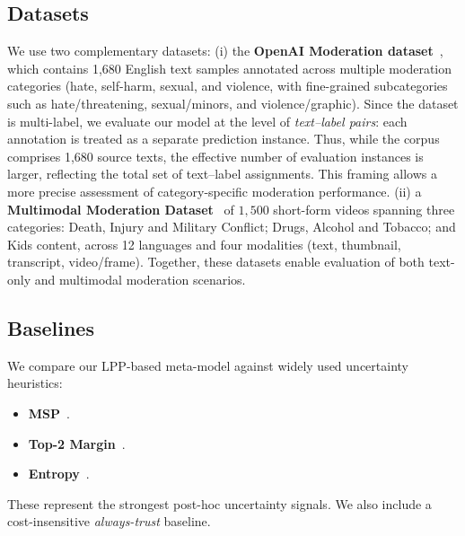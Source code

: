 \subsection{Datasets}
We use two complementary datasets:  
(i) the \textbf{OpenAI Moderation dataset}~\cite{markov2023holisticapproachundesiredcontent}, which contains 1,680 English text samples annotated across multiple moderation categories (hate, self-harm, sexual, and violence, with fine-grained subcategories such as hate/threatening, sexual/minors, and violence/graphic). Since the dataset is multi-label, we evaluate our model at the level of \emph{text–label pairs}: each annotation is treated as a separate prediction instance. Thus, while the corpus comprises 1,680 source texts, the effective number of evaluation instances is larger, reflecting the total set of text–label assignments. This framing allows a more precise assessment of category-specific moderation performance.  
(ii) a \textbf{Multimodal Moderation Dataset}~\cite{levi+al:25} of $1{,}500$ short-form videos spanning three categories: Death, Injury and Military Conflict; Drugs, Alcohol and Tobacco; and Kids content, across 12 languages and four modalities (text, thumbnail, transcript, video/frame). Together, these datasets enable evaluation of both text-only and multimodal moderation scenarios.  

\subsection{Baselines}
We compare our LPP-based meta-model against widely used uncertainty heuristics:
\begin{itemize}
    \item \textbf{MSP}~\cite{hendrycks2017a,geifman2017selectiveclassificationdeepneural}.
    \item \textbf{Top-2 Margin}~\cite{gupta2024language}.
    \item \textbf{Entropy}~\cite{kendall+al:17,barshalom2025tokenprobabilitieslearnablefast}.
\end{itemize}
These represent the strongest post-hoc uncertainty signals. We also include a cost-insensitive \emph{always-trust} baseline.
